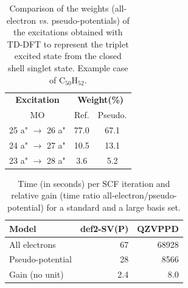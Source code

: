 \documentclass[12pt]{article}
\begin{document}
\newpage
\begin{table}
\caption{\label{tab:coef}Comparison of the weights (all-electron \emph{vs.} pseudo-potentials)
of the excitations obtained with TD-DFT
to represent the triplet excited state from the closed shell singlet state.
Example case of C$_{50}$H$_{52}$.}
\begin{tabular}{|c |c |c |c|}
\hline
\multicolumn{2}{|c|}{\textbf{Excitation}} & \multicolumn{2}{c|}{\textbf{Weight(\%)}}\\
\multicolumn{2}{|c|}{MO} & Ref. & Pseudo.\\
\hline
\multicolumn{2}{|c|}{25 a" \(\rightarrow\) 26 a"} & 77.0 &   67.1  \\\hline
\multicolumn{2}{|c|}{24 a" \(\rightarrow\) 27 a"} & 10.5 &   13.1  \\\hline
\multicolumn{2}{|c|}{23 a" \(\rightarrow\) 28 a"} & 3.6  &    5.2  \\
\hline
\end{tabular}
\end{table}

\begin{table}[ht]
\caption{\label{tab:time}Time (in seconds) per SCF iteration and relative
gain (time ratio all-electron/pseudo-potential) for a standard and a large basis set.} 
\begin{tabular}{|l|r|r|}
\hline
\textbf{Model}            & \textbf{def2-SV(P)} & \textbf{QZVPPD} \\
\hline
All electrons    &        67 & 68928 \\\hline
Pseudo-potential &        28 &  8566 \\\hline
Gain (no unit)   &       2.4 &   8.0 \\
\hline
\end{tabular}
\end{table}
\end{document}
